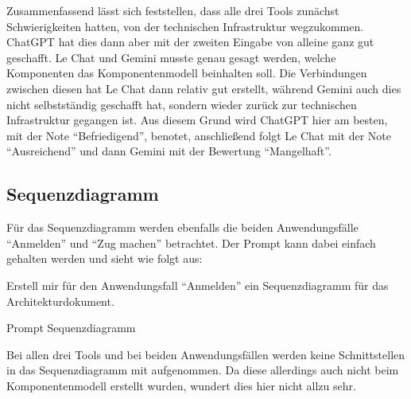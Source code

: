 Zusammenfassend lässt sich feststellen, dass alle drei Tools zunächst Schwierigkeiten hatten, von der technischen Infrastruktur wegzukommen. ChatGPT 
hat dies dann aber mit der zweiten Eingabe von alleine ganz gut geschafft. Le Chat und Gemini musste genau gesagt werden, welche Komponenten das 
Komponentenmodell beinhalten soll. Die Verbindungen zwischen diesen hat Le Chat dann relativ gut erstellt, während Gemini auch dies nicht 
selbstständig geschafft hat, sondern wieder zurück zur technischen Infrastruktur gegangen ist. Aus diesem Grund wird ChatGPT hier am besten, mit 
der Note ``Befriedigend'', benotet, anschließend folgt Le Chat mit der Note ``Ausreichend'' und dann Gemini mit der Bewertung ``Mangelhaft''.

\subsection*{Sequenzdiagramm}

Für das Sequenzdiagramm werden ebenfalls die beiden Anwendungsfälle ``Anmelden'' und ``Zug machen'' betrachtet. Der Prompt 
kann dabei einfach gehalten werden und sieht wie folgt aus:

\begin{prompt}[H]
    \begin{tcolorbox}[colback=gray!20, colframe=gray!20, boxrule=0pt, sharp corners] 
        Erstell mir für den Anwendungsfall ``Anmelden'' ein Sequenzdiagramm für das Architekturdokument.
        \vfill
    \end{tcolorbox}
    \caption{Prompt Sequenzdiagramm}
    \label{Prompt Sequenzdiagramm}
\end{prompt}

Bei allen drei Tools und bei beiden Anwendungsfällen werden keine Schnittstellen in das Sequenzdiagramm mit 
aufgenommen. Da diese allerdings auch nicht beim Komponentenmodell erstellt wurden, wundert dies hier nicht allzu sehr.

